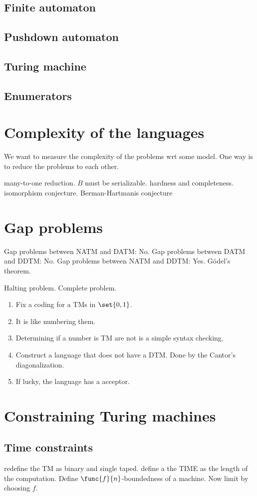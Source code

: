 \subsection{Finite automaton}
\subsection{Pushdown automaton}
\subsection{Turing machine}
\subsection{Enumerators}
\section{Complexity of the languages}
We want to measure the complexity of the problems wrt some model. One way is to reduce the problems to each other.

many-to-one reduction. \(B\) must be serializable.
hardness and completeness.
isomorphism conjecture. Berman-Hartmanis conjecture
\section{Gap problems}
Gap problems between NATM and DATM: No.
Gap problems between DATM and DDTM: No.
Gap problems between NATM and DDTM: Yes. G\"{o}del's theorem.

Halting problem. Complete problem.

\begin{enumerate}
    \item Fix a coding for a TMs in \(\set{0,1}\).
    \item It is like numbering them.
    \item Determining if a number is TM are not is a simple syntax checking.
    \item Construct a language that does not have a DTM. Done by the Cantor's diagonalization.
    \item If lucky, the language has a acceptor.
\end{enumerate}

\section{Constraining Turing machines}
\subsection{Time constraints}
redefine the TM as binary and single taped. define a the TIME as the length of the computation. Define \(\func{f}{n}\)-boundedness of a machine. Now limit by choosing \(f\). 


